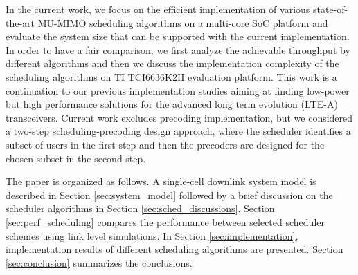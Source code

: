 \documentclass[conference,letterpaper]{./../../IEEE/IEEEtran}
\begin{document}
In the current work, we focus on the efficient implementation of various state-of-the-art MU-MIMO scheduling algorithms on a multi-core \ac{SoC} platform and evaluate the system size that can be supported with the current implementation. In order to have a fair comparison, we first analyze the achievable throughput by different algorithms and then we discuss the implementation complexity of the scheduling algorithms on TI TCI6636K2H evaluation platform. This work is a continuation to our previous implementation studies \cite{Janhunen-etal-11, Hanninen-etal-2014, Shahabuddin-etal-2014} aiming at finding low-power but high performance solutions for the advanced long term evolution (LTE-A) transceivers. Current work excludes precoding implementation, but we considered a two-step scheduling-precoding design approach, where the scheduler identifies a subset of users in the first step and then the precoders are designed for the chosen subset in the second step.

The paper is organized as follows. A single-cell downlink system model is described in Section \ref{sec:system_model} followed by a brief discussion on the scheduler algorithms in Section \ref{sec:sched_discussions}. Section \ref{sec:perf_scheduling} compares the performance between selected scheduler schemes using link level simulations. In Section \ref{sec:implementation}, implementation results of different scheduling algorithms are presented. Section \ref{sec:conclusion} summarizes the conclusions.
\end{document}
